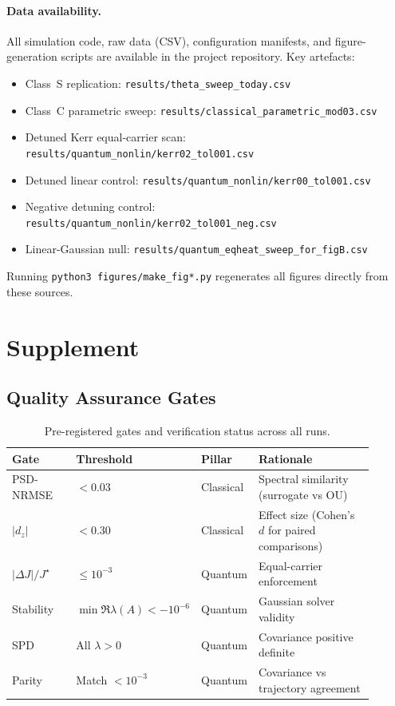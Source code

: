 \documentclass[11pt,letterpaper]{article}
\begin{document}
\paragraph*{Data availability.}
\begin{sloppypar}
All simulation code, raw data (CSV), configuration manifests, and figure-generation scripts are available in the project repository. Key artefacts:
\begin{itemize}[nosep,leftmargin=*]
\item Class~S replication: \texttt{results/\allowbreak theta\_sweep\_today.csv}
\item Class~C parametric sweep: \texttt{results/\allowbreak classical\_parametric\_mod03.csv}
\item Detuned Kerr equal-carrier scan: \texttt{results/\allowbreak quantum\_nonlin/\allowbreak kerr02\_tol001.csv}
\item Detuned linear control: \texttt{results/\allowbreak quantum\_nonlin/\allowbreak kerr00\_tol001.csv}
\item Negative detuning control: \texttt{results/\allowbreak quantum\_nonlin/\allowbreak kerr02\_tol001\_neg.csv}
\item Linear-Gaussian null: \texttt{results/\allowbreak quantum\_eqheat\_sweep\_for\_figB.csv}
\end{itemize}
Running \texttt{python3\ figures/\allowbreak make\_fig*.py} regenerates all figures directly from these sources.
\end{sloppypar}

\clearpage
\section*{Supplement}

\subsection*{Quality Assurance Gates}

\begin{table}[t]
\centering
\caption{Pre-registered gates and verification status across all runs.}
\label{tab:qa_gates}
\begin{tabular}{@{}p{0.20\linewidth}p{0.15\linewidth}p{0.15\linewidth}p{0.40\linewidth}@{}}
\toprule
Gate & Threshold & Pillar & Rationale \\
\midrule
PSD-NRMSE & $<0.03$ & Classical & Spectral similarity (surrogate vs OU) \\
$|d_z|$ & $<0.30$ & Classical & Effect size (Cohen's $d$ for paired comparisons) \\
$|\Delta J|/J^\star$ & $\le 10^{-3}$ & Quantum & Equal-carrier enforcement \\
Stability & $\min \Re\lambda(A) < -10^{-6}$ & Quantum & Gaussian solver validity \\
SPD & All $\lambda > 0$ & Quantum & Covariance positive definite \\
Parity & Match $<10^{-3}$ & Quantum & Covariance vs trajectory agreement \\
\bottomrule
\end{tabular}
\end{table}
\end{document}
